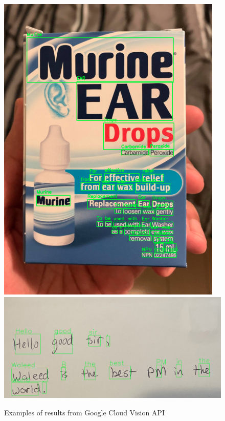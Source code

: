\documentclass[a4paper,11pt]{article}
\begin{document}
\begin{figure}[H]
\centering
\includegraphics[scale=0.5]{img/cv/ocr/ocr_text_in_the_wild.png}
\includegraphics[scale=0.5]{img/cv/ocr/ocr_handwriting.png}
\caption{Examples of results from Google Cloud Vision API}
\label{fig:google_vision_examples}
\end{figure}
\end{document}
